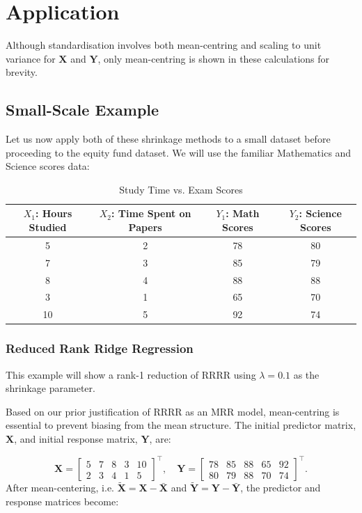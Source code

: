 \documentclass[11pt]{report} %
\begin{document}
\section{Application}
Although standardisation involves both mean-centring and scaling to unit variance for $\mathbf{X}$ and $\mathbf{Y}$, only mean-centring is shown in these calculations for brevity.
\vspace{-0.2cm}
\subsection{Small-Scale Example}
Let us now apply both of these shrinkage methods to a small dataset before proceeding to the equity fund dataset. We will use the familiar Mathematics and Science scores data:

\begin{table}[H]
    \centering
    \begin{tabular}{|c|c|c|c|}
        \hline
        \( X_1 \): Hours Studied & \( X_2 \): Time Spent on Papers & \( Y_1 \): Math Scores & \( Y_2 \): Science Scores\\
        \hline
        5  & 2  & 78 & 80 \\
        7  & 3  & 85 & 79 \\
        8  & 4  & 88 & 88 \\
        3  & 1  & 65 & 70 \\
        10 & 5  & 92 & 74 \\
        \hline
    \end{tabular}
    \caption{Study Time vs. Exam Scores}
    \label{tab:study_scores4}
\end{table}
\subsubsection{Reduced Rank Ridge Regression}
This example will show a rank-1 reduction of RRRR using $\lambda = 0.1$ as the shrinkage parameter.

Based on our prior justification of RRRR as an MRR model, mean-centring is essential to prevent biasing from the mean structure. The initial predictor matrix, \( \mathbf{X} \), and initial response matrix, \( \mathbf{Y} \), are:

\[
\mathbf{X} = 
\begin{bmatrix}
5 & 7 & 8 & 3 & 10 \\
2 & 3 & 4 & 1 & 5
\end{bmatrix}^\top, 
\quad
\mathbf{Y} = 
\begin{bmatrix}
78 & 85 & 88 & 65 & 92 \\
80 & 79 & 88 & 70 & 74
\end{bmatrix}^\top.
\]
\noindent After mean-centering, i.e. $\mathbf{\tilde{X}} = \mathbf{X}-\mathbf{\bar{X}}$ and $\mathbf{\tilde{Y}} = \mathbf{Y}-\mathbf{\bar{Y}}$, the predictor and response matrices become:
\end{document}
